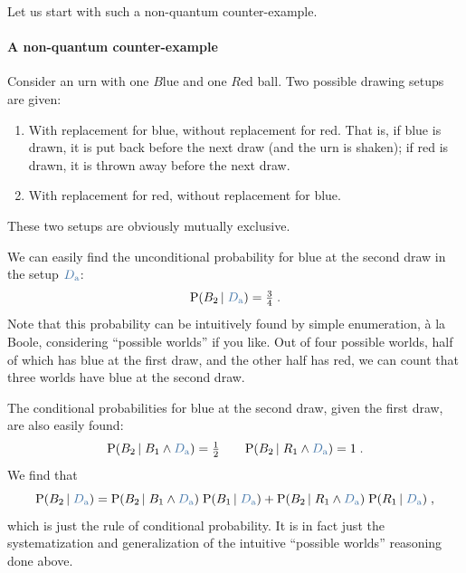 \documentclass[\ifafour a4paper,12pt,\else a5paper,10pt,\fi%
onecolumn,oneside,article,%
british%
]{memoir}
\theoremstyle{remark}
\theoremstyle{innote}
\newcommand*{\p}{\mathrm{P}}%
\renewcommand*{\|}[1][]{\nonscript\,#1\vert\nonscript\;\mathopen{}}
\newcommand*{\yDa}{\textcolor{mypurpleblue}{D_{\textrm{a}}}}
\newcommand*{\yDb}{\textcolor{myredpurple}{D_{\textrm{b}}}}
\begin{document}
Let us start with such a non-quantum counter-example.

\bigskip

\paragraph{A non-quantum counter-example}

Consider an urn with one $B$lue and one $R$ed ball. Two possible
drawing setups are given:
\begin{enumerate}%
\item[$\yDa$]\label{item:repB} With replacement for blue, without replacement for
  red. That is, if blue is drawn, it is put back before the next draw (and
  the urn is shaken); if red is drawn, it is thrown away before the next
  draw.
\item[$\yDb$]\label{item:repR} With replacement for red, without replacement for
  blue.
\end{enumerate}
These two setups are obviously mutually exclusive.

We can easily find the unconditional probability for blue at the
second draw in the setup $\yDa$:
\begin{equation}
  \label{eq:A_red2}
  \p(B_{2} \| \yDa) = \tfrac{3}{4} \;.
\end{equation}
Note that this probability can be intuitively found by simple enumeration,
\`a la Boole, considering \enquote{possible worlds} if you like. Out of
four possible worlds, half of which has blue at the first draw, and the
other half has red, we can count that three worlds have blue at the second
draw.

The conditional probabilities for blue at the second draw,
given the first draw, are also easily found:
\begin{equation}
  \label{eq:A_red2cond}
  \p(B_{2} \| B_{1} \land \yDa) = \tfrac{1}{2} \qquad
  \p(B_{2} \| R_{1} \land \yDa) = 1 \;.
\end{equation}
We find that
\begin{equation}
  \label{eq:A_rule}
  \p(B_{2} \| \yDa) =%
  \p(B_{2} \| B_{1} \land \yDa) \; \p( B_{1} \| \yDa) +
  \p(B_{2} \| R_{1} \land \yDa)  \; \p( R_{1} \| \yDa) \;,
\end{equation}
which is just the rule of conditional probability. It is in fact just the
systematization and generalization of the intuitive \enquote{possible
  worlds} reasoning done above.
\end{document}
